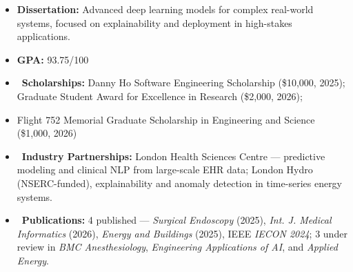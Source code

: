 \documentclass[10pt,a4paper,ragged2e]{altacv}
\begin{document}
\vspace{1mm}

\vspace{-1mm}
\begin{itemize}
\item \textbf{Dissertation:} Advanced deep learning models for complex real-world systems, focused on explainability and deployment in high-stakes applications.
\item \textbf{GPA:} 93.75/100
\item[] \hspace*{-1.35\leftmargin} \textcolor{VividPurple}{\faTrophy\ \textbf{Scholarships:}} Danny Ho Software Engineering Scholarship (\$10,000, 2025);
\hspace*{15mm} Graduate Student Award for Excellence in Research (\$2,000, 2026);
\item[] \hspace*{-1.35\leftmargin} \hspace*{15mm} Flight 752 Memorial Graduate Scholarship in Engineering and Science (\$1,000, 2026)
\item[] \hspace*{-1.4\leftmargin} \textcolor{VividPurple}{\faInstitution\ \textbf{Industry Partnerships:}} London Health Sciences Centre --- predictive modeling and clinical NLP from large-scale EHR data; London Hydro (NSERC-funded), explainability and anomaly detection in time-series energy systems.
\item[] \hspace*{-1.35\leftmargin} \textcolor{VividPurple}{\faBook\ \textbf{Publications:}} 4 published --- \textit{Surgical Endoscopy} (2025), \textit{Int. J. Medical Informatics} (2026), \textit{Energy and Buildings} (2025), IEEE \textit{IECON 2024}; 3 under review in \textit{BMC Anesthesiology}, \textit{Engineering Applications of AI}, and \textit{Applied Energy}.
\end{itemize}

\vspace{-7pt}
\divider
\end{document}
